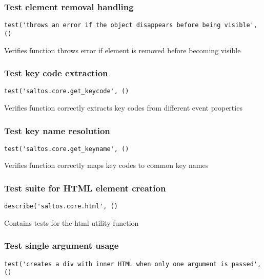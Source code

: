 \documentclass[a4paper]{article}
\begin{document}
\hypertarget{toc63}{}
\subsubsection{Test element removal handling}

\begin{lstlisting}
test('throws an error if the object disappears before being visible', ()
\end{lstlisting}

Verifies function throws error if element is removed before becoming visible

\hypertarget{toc64}{}
\subsubsection{Test key code extraction}

\begin{lstlisting}
test('saltos.core.get_keycode', ()
\end{lstlisting}

Verifies function correctly extracts key codes from different event properties

\hypertarget{toc65}{}
\subsubsection{Test key name resolution}

\begin{lstlisting}
test('saltos.core.get_keyname', ()
\end{lstlisting}

Verifies function correctly maps key codes to common key names

\hypertarget{toc66}{}
\subsubsection{Test suite for HTML element creation}

\begin{lstlisting}
describe('saltos.core.html', ()
\end{lstlisting}

Contains tests for the html utility function

\hypertarget{toc67}{}
\subsubsection{Test single argument usage}

\begin{lstlisting}
test('creates a div with inner HTML when only one argument is passed', ()
\end{lstlisting}
\end{document}

